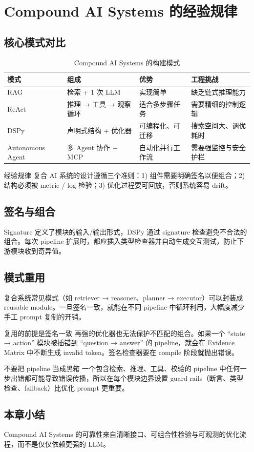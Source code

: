 \section{Compound AI Systems 的经验规律}

\subsection{核心模式对比}

\begin{table}[H]
\centering
\caption{Compound AI Systems 的构建模式}
\begin{tabular}{p{}p{}p{}p{}}
\toprule
模式 & 组成 & 优势 & 工程挑战 \\
\midrule
RAG & 检索 + 1 次 LLM & 实现简单 & 缺乏链式推理能力 \\
ReAct & 推理 → 工具 → 观察 循环 & 适合多步骤任务 & 需要精细的控制逻辑 \\
DSPy & 声明式结构 + 优化器 & 可编程化、可迁移 & 搜索空间大、调优耗时 \\
Autonomous Agent & 多 Agent 协作 + MCP & 自动化并行工作流 & 需要强监控与安全护栏 \\
\bottomrule
\end{tabular}
\end{table}

\begin{knowledgebox}{经验规律}
复合 AI 系统的设计遵循三个准则：1) 组件需要明确签名以便组合；2) 结构必须被 metric / log 检验；3) 优化过程要可回放，否则系统容易 drift。
\end{knowledgebox}

\subsection{签名与组合}

Signature 定义了模块的输入/输出形式，DSPy 通过 signature 检查避免不合法的组合。每次 pipeline 扩展时，都应插入类型检查器并自动生成交互测试，防止下游模块收到奇异值。

\subsection{模式重用}

复合系统常见模式（如 retriever → reasoner、planner → executor）可以封装成 reusable module。一旦签名一致，就能在不同 pipeline 中循环利用，大幅度减少手工 prompt 复制的开销。

\begin{knowledgebox}{复用的前提是签名一致}
再强的优化器也无法保护不匹配的组合。如果一个 ``state → action'' 模块被插错到 ``question → answer'' 的 pipeline，就会在 Evidence Matrix 中不断生成 invalid token。签名检查器要在 compile 阶段就抛出错误。
\end{knowledgebox}

\begin{warningbox}{不要把 pipeline 当成黑箱}
一个包含检索、推理、工具、校验的 pipeline 中任何一步出错都可能导致错误传播，所以在每个模块边界设置 guard rails（断言、类型检查、fallback）比优化 prompt 更重要。
\end{warningbox}

\subsection{本章小结}

Compound AI Systems 的可靠性来自清晰接口、可组合性检验与可观测的优化流程，而不是仅仅依赖更强的 LLM。

